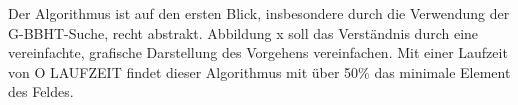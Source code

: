 Der Algorithmus ist auf den ersten Blick, insbesondere durch die Verwendung der G-BBHT-Suche, recht abstrakt. 
Abbildung x soll das Verständnis durch eine vereinfachte, grafische Darstellung des Vorgehens vereinfachen. 
Mit einer Laufzeit von O LAUFZEIT findet dieser Algorithmus mit über 50\% das minimale Element des Feldes.
